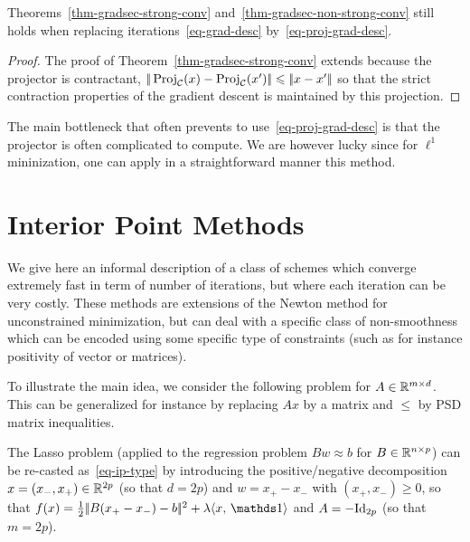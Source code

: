 \begin{thm}\label{thm-proj-grad}
	Theorems~\ref{thm-gradsec-strong-conv} and~\ref{thm-gradsec-non-strong-conv} still holds when replacing iterations~\eqref{eq-grad-desc} by~\eqref{eq-proj-grad-desc}.
\end{thm}

\begin{proof}
	The proof of Theorem~\ref{thm-gradsec-strong-conv} extends because the projector is contractant, 
	$|\!| \operatorname{Proj}_{\mathcal{C}}(x)-\operatorname{Proj}_{\mathcal{C}}(x') |\!| \leqslant |\!| x-x' |\!|$ so that the strict contraction properties of the gradient descent is maintained by this projection.   
\end{proof}

The main bottleneck that often prevents to use~\eqref{eq-proj-grad-desc} is that the projector is often complicated to compute. We are however lucky since for $\ell^1$ mininization, one can apply in a straightforward manner this method. 


\section{Interior Point Methods}

We give here an informal description of a class of schemes which converge extremely fast in term of number of iterations, but where each iteration can be very costly. These methods are extensions of the Newton method for unconstrained minimization, but can deal with a specific class of non-smoothness which can be encoded using some specific type of constraints (such as for instance positivity of vector or matrices).


To illustrate the main idea, we consider the following problem
for $A \in \mathbb{R}^{m \times d}$.
%
This can be generalized for instance by replacing $A x$ by a matrix and $\leq$ by PSD matrix inequalities. 

\begin{exmp}[Lasso]
	The Lasso problem (applied to the regression problem $Bw \approx b$ for $B \in \mathbb{R}^{n \times p}$)
	can be re-casted as~\eqref{eq-ip-type} by introducing the positive/negative decomposition 
	$x=(x_-,x_+) \in \mathbb{R}^{2p}$ (so that $d=2p$)  and $w = x_+ - x_-$ with $(x_+,x_-) \geq 0$, so that 
	$f(x) = \frac{1}{2}\norm{B(x_+-x_-)-b}^2 + \la \dotp{x}{\ones}$ and $A=-\mathrm{Id}_{2p}$ (so that $m=2p$).
\end{exmp}

